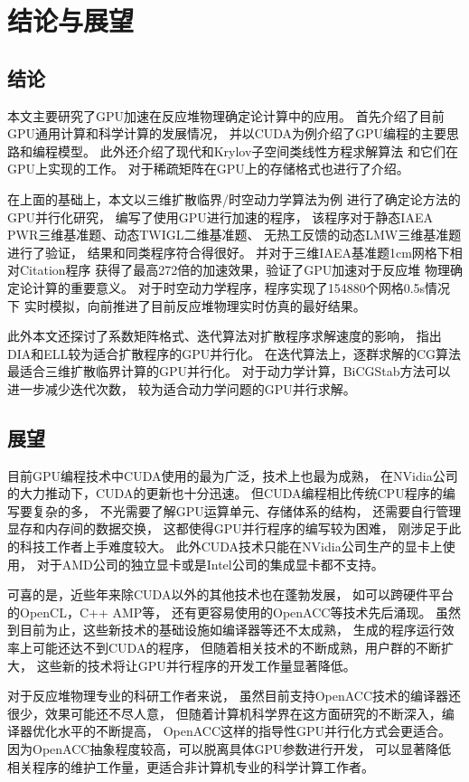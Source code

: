 
\chapter{结论与展望}

\section{结论}

本文主要研究了GPU加速在反应堆物理确定论计算中的应用。
首先介绍了目前GPU通用计算和科学计算的发展情况，
并以CUDA为例介绍了GPU编程的主要思路和编程模型。
此外还介绍了现代和Krylov子空间类线性方程求解算法
和它们在GPU上实现的工作。
对于稀疏矩阵在GPU上的存储格式也进行了介绍。

在上面的基础上，本文以三维扩散临界/时空动力学算法为例
进行了确定论方法的GPU并行化研究，
编写了使用GPU进行加速的\ProgramName 程序，
该程序对于静态IAEA PWR三维基准题、动态TWIGL二维基准题、
无热工反馈的动态LMW三维基准题进行了验证，
结果和同类程序符合得很好。
并对于三维IAEA基准题1cm网格下相对Citation程序
获得了最高272倍的加速效果，验证了GPU加速对于反应堆
物理确定论计算的重要意义。
对于时空动力学程序，\ProgramName 程序实现了154880个网格0.5s情况下
实时模拟，向前推进了目前反应堆物理实时仿真的最好结果。

此外本文还探讨了系数矩阵格式、迭代算法对扩散程序求解速度的影响，
指出DIA和ELL较为适合扩散程序的GPU并行化。
在迭代算法上，逐群求解的CG算法最适合三维扩散临界计算的GPU并行化。
对于动力学计算，BiCGStab方法可以进一步减少迭代次数，
较为适合动力学问题的GPU并行求解。

\section{展望}

目前GPU编程技术中CUDA使用的最为广泛，技术上也最为成熟，
在NVidia公司的大力推动下，CUDA的更新也十分迅速。
但CUDA编程相比传统CPU程序的编写要复杂的多，
不光需要了解GPU运算单元、存储体系的结构，
还需要自行管理显存和内存间的数据交换，
这都使得GPU并行程序的编写较为困难，
刚涉足于此的科技工作者上手难度较大。
此外CUDA技术只能在NVidia公司生产的显卡上使用，
对于AMD公司的独立显卡或是Intel公司的集成显卡都不支持。

可喜的是，近些年来除CUDA以外的其他技术也在蓬勃发展，
如可以跨硬件平台的OpenCL，C++ AMP等，
还有更容易使用的OpenACC等技术先后涌现。
虽然到目前为止，这些新技术的基础设施如编译器等还不太成熟，
生成的程序运行效率上可能还达不到CUDA的程序，
但随着相关技术的不断成熟，用户群的不断扩大，
这些新的技术将让GPU并行程序的开发工作量显著降低。

对于反应堆物理专业的科研工作者来说，
虽然目前支持OpenACC技术的编译器还很少，效果可能还不尽人意，
但随着计算机科学界在这方面研究的不断深入，编译器优化水平的不断提高，
OpenACC这样的指导性GPU并行化方式会更适合。
因为OpenACC抽象程度较高，可以脱离具体GPU参数进行开发，
可以显著降低相关程序的维护工作量，更适合非计算机专业的科学计算工作者。
